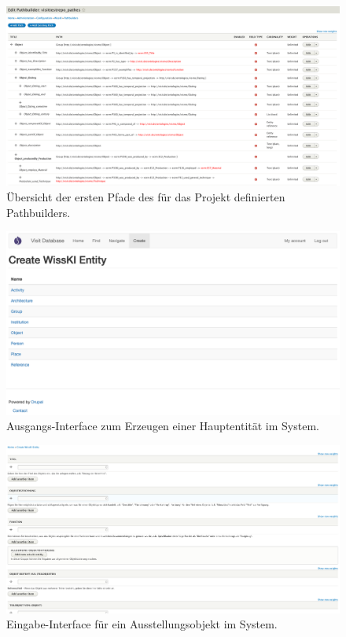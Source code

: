 \begin{figure}
    \includegraphics[width=1.0\textwidth,height=0.4\textwidth]{Figures/berndl/pathbuilder}
    \caption{\label{fig:pathbuilder} Übersicht der ersten Pfade des für das \visit Projekt definierten Pathbuilders.}
\end{figure}

\begin{figure}[htb]
    \centering
    \includegraphics[width=\textwidth]{Figures/berndl/wisskiCreate}
    \caption{\label{fig:wisskiCreate} Ausgangs-Interface zum Erzeugen einer Hauptentität im \wisski System.}
\end{figure}

\begin{figure}
    \includegraphics[width=1.0\textwidth,height=0.4\textwidth]{Figures/berndl/wisskiCreateObject}
    \caption{\label{fig:wisskiCreateObject} Eingabe-Interface für ein Ausstellungsobjekt im \visit \wisski System.}
\end{figure}

